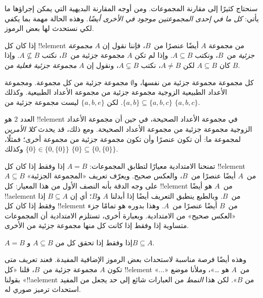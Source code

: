 \documentclass[../../../include/open-logic-section]{subfiles}
\begin{document}

\begin{explain}
سنحتاج كثيرًا إلى مقارنة المجموعات. ومن أوجه المقارنة البديهية
التي يمكن إجراؤها ما يأتي: \emph{كل ما في إحدى المجموعتين موجود في
الأخرى أيضًا}. وهذه الحالة مهمة بما يكفي لكي
نستحدث لها بعض الرموز.
\end{explain}

\begin{defn}
إذا كان كل !!{element} من مجموعة $A$ أيضًا عنصرًا من~$B$، فإننا
نقول إن $A$ \emph{مجموعة جزئية} من~$B$، ونكتب $A \subseteq B$. وإذا
لم تكن $A$ مجموعة جزئية من~$B$، نكتب $A \not\subseteq B$.
وإذا كان $A \subseteq B$ لكن $A \neq B$، نكتب $A \subsetneq B$، ونقول
إن $A$ \emph{مجموعة جزئية فعلية} من $B$.
\end{defn}

\begin{ex}
كل مجموعة مجموعة جزئية من نفسها، و$\emptyset$ مجموعة جزئية من كل
مجموعة. ومجموعة الأعداد الطبيعية الزوجية مجموعة جزئية من مجموعة الأعداد الطبيعية.
وكذلك $\{ a, b \} \subseteq \{ a, b, c \}$. لكن $\{ a, b, e
\}$ ليست مجموعة جزئية من $\{ a, b, c \}$.
\end{ex}

\begin{ex}
العدد $2$ هو !!{element} في مجموعة الأعداد الصحيحة، في حين أن
مجموعة الأعداد الزوجية مجموعة جزئية من مجموعة الأعداد الصحيحة. ومع ذلك، قد
يحدث \emph{كلا الأمرين} لمجموعة ما: أن تكون عنصرًا وأن تكون مجموعة جزئية من
مجموعة أخرى؛ فمثلًا، $\{0\} \in \{0, \{0\}\}$ وكذلك $\{0\} \subseteq \{0,
\{0\}\}$.
\end{ex}

تمنحنا الامتدادية معيارًا لتطابق المجموعات: $A = B$ إذا وفقط إذا كان
كل !!{element} من~$A$ أيضًا عنصرًا من~$B$، والعكس صحيح.
ويعرّف تعريف «المجموعة الجزئية» $A \subseteq B$ على وجه الدقة بأنه
النصف الأول من هذا المعيار: كل !!{element} من~$A$ هو أيضًا
!!a{element} من~$B$. وبالطبع ينطبق التعريف أيضًا إذا
أبدلنا $A$ و$B$؛ أي إن $B \subseteq A$ إذا وفقط إذا كان كل !!{element}
من~$B$ أيضًا عنصرًا من~$A$. وهذا بدوره هو تمامًا
جزء «العكس صحيح» من الامتدادية. وبعبارة أخرى، تستلزم الامتدادية
أن المجموعات متساوية إذا وفقط إذا كانت كل منها مجموعة جزئية من الأخرى.

\begin{prop}
$A = B$ إذا وفقط إذا تحقق كل من $A \subseteq B$ و$B \subseteq A$.
\end{prop}

وهذه أيضًا فرصة مناسبة لاستحداث بعض الرموز الإضافية
المفيدة. فعند تعريف متى تكون $A$ مجموعة جزئية من~$B$، قلنا
«كل !!{element} من~$A$ هو \dots»، وملأنا موضع «$\dots$» بقولنا
«!!a{element} من $B$». لكن هذا \emph{النمط} من
العبارات شائع إلى حد يجعل من المفيد استحداث ترميز صوري
له.
\end{document}
